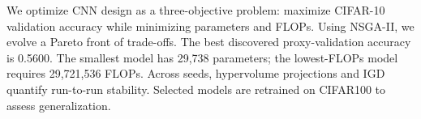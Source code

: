 We optimize CNN design as a three-objective problem: maximize CIFAR-10 validation accuracy while minimizing parameters and FLOPs. Using NSGA-II, we evolve a Pareto front of trade-offs. The best discovered proxy-validation accuracy is 0.5600. The smallest model has 29,738 parameters; the lowest-FLOPs model requires 29,721,536 FLOPs. Across seeds, hypervolume projections and IGD quantify run-to-run stability. Selected models are retrained on CIFAR100 to assess generalization.
